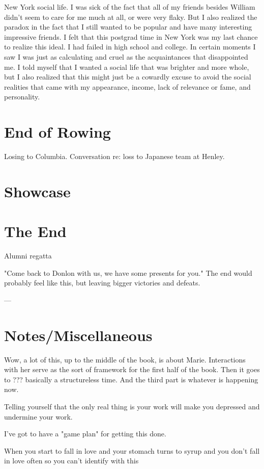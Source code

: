 \documentclass[12pt]{article}
\begin{document}
New York social life.  I was sick of the fact that all of my friends besides
William didn't seem to care for me much at all, or were very flaky.  But I also
realized the paradox in the fact that I still wanted to be popular and have many
interesting impressive friends.  I felt that this postgrad time in New York was
my last chance to realize this ideal.  I had failed in high school and college.
In certain moments I saw I was just as calculating and cruel as the
acquaintances that disappointed me.  I told myself that I wanted a social life
that was brighter and more whole, but I also realized that this might just be a
cowardly excuse to avoid the social realities that came with my appearance,
income, lack of relevance or fame, and personality.


\section{End of Rowing}
Losing to Columbia.
Conversation re: loss to Japanese team at Henley.

\section{Showcase}


\section{The End}
Alumni regatta

"Come back to Donlon with us, we have some presents for you."
The end would probably feel like this, but leaving bigger victories and defeats.

---

\section{Notes/Miscellaneous}
Wow, a lot of this, up to the middle of the book, is about Marie.  Interactions
with her serve as the sort of framework for the first half of the book.  Then it
goes to ???  basically a structureless time.  And the third part is whatever is
happening now.

Telling yourself that the only real thing is your work will make you depressed
and undermine your work.  

I've got to have a "game plan" for getting this done.

When you start to fall in love
and your stomach turns to syrup
and you don't fall in love often
so you can't identify with this
\end{document}
